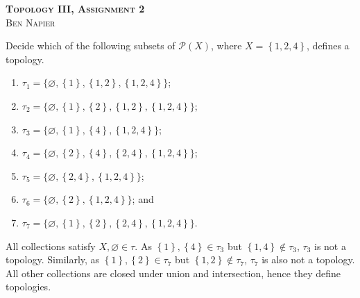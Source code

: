 \documentclass[a4paper, answers]{exam}
\begin{document}
\begin{center}
	\textbf{\textsc{Topology III, Assignment 2}}
	\\
	\textsc{Ben Napier}
	\vspace{1em}
\end{center}
\begin{questions}
	\question
		Decide which of the following subsets of $\mathcal P(X)$,
		where $X = \left\{ 1,2,4 \right\}$, defines a topology.
		\begin{enumerate}
			\item $
				\tau_1 = \{
					\varnothing,
					\left\{ 1 \right\},
					\left\{ 1, 2 \right\},
					\left\{ 1, 2, 4 \right\}
				\}
			$;

			\item $
				\tau_2 = \{
					\varnothing,
					\left\{ 1 \right\},
					\left\{ 2 \right\},
					\left\{ 1, 2 \right\},
					\left\{ 1, 2, 4 \right\}
				\}
			$;

			\item $
				\tau_3 = \{
					\varnothing,
					\left\{ 1 \right\},
					\left\{ 4 \right\},
					\left\{ 1, 2, 4 \right\}
				\}
			$;

			\item $
				\tau_4 = \{
					\varnothing,
					\left\{ 2 \right\},
					\left\{ 4 \right\},
					\left\{ 2, 4 \right\},
					\left\{ 1, 2, 4 \right\}
				\}
			$;

			\item $
				\tau_5 = \{
					\varnothing,
					\left\{ 2, 4 \right\},
					\left\{ 1, 2, 4 \right\}
				\}
			$;

			\item $
				\tau_6 = \{
					\varnothing,
					\left\{ 2 \right\},
					\left\{ 1, 2, 4 \right\}
				\}
			$; and

			\item $
				\tau_7 = \{
					\varnothing,
					\left\{ 1 \right\},
					\left\{ 2 \right\},
					\left\{ 2, 4 \right\},
					\left\{ 1, 2, 4 \right\}
				\}
			$.
		\end{enumerate}
	\begin{solution}
		All collections satisfy $X, \varnothing \in \tau$.
		As $\left\{ 1 \right\}, \left\{ 4 \right\} \in \tau_3$
		but $\left\{ 1,4 \right\} \not\in \tau_3$, $\tau_3$ is not a
		topology.
		Similarly, as $\left\{ 1 \right\}, \left\{ 2 \right\} \in \tau_7$
		but $\left\{ 1, 2 \right\} \not\in \tau_7$, $\tau_7$ is also
		not a topology.
		All other collections are closed under union and intersection,
		hence they define topologies.
	\end{solution}
		

\end{questions}
\end{document}
